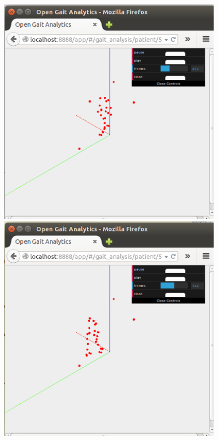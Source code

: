 \begin{figure}[H]
  \centering
  \begin{minipage}[b]{0.32\textwidth}
    \includegraphics[width=\textwidth]{figuras/tela8.eps}
  \end{minipage}
  \hfill
  \begin{minipage}[b]{0.32\textwidth}
    \includegraphics[width=\textwidth]{figuras/tela9.eps}

\end{minipage}
\end{figure}

